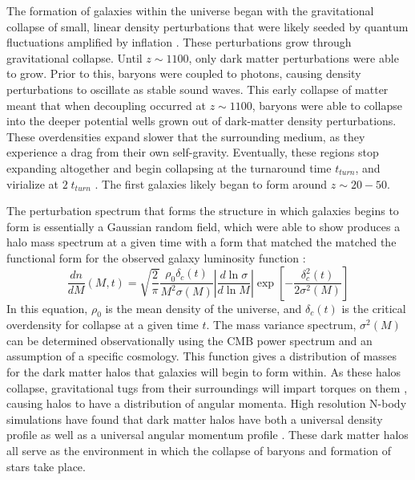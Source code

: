 The formation of galaxies within the universe began with the gravitational
collapse of small, linear density perturbations that were likely seeded by
quantum fluctuations amplified by inflation
\citep{Guth1981,Linde1982}.  These perturbations grow through
gravitational collapse.  Until $z\sim1100$, only dark matter perturbations were
able to grow.  Prior to this, baryons were coupled to photons, causing density
perturbations to oscillate as stable sound waves.  This early collapse
of matter meant that when decoupling occurred at $z\sim1100$, baryons were able
to collapse into the deeper potential wells grown out of dark-matter density
perturbations.  These overdensities expand slower that the surrounding medium,
as they experience a drag from their own self-gravity.  Eventually, these
regions stop expanding altogether and begin collapsing at the turnaround time
$t_{turn}$, and virialize at $2\;t_{turn}$ \citep{Peebles1980}. The first
galaxies likely began to form around $z\sim20-50$.

The perturbation spectrum that forms the structure in which galaxies begins to
form is essentially a Gaussian random field, which \citet{Press1974} were able
to show produces a halo mass spectrum at a given time with a form that matched
the matched the functional form for the observed galaxy luminosity function
\citet{Schechter1976}:
\begin{equation}
    \frac{dn}{dM}(M,t) =
    \sqrt{\frac{2}{\pi}}\frac{\rho_0\delta_c(t)}{M^2\sigma(M)} 
    \left\lvert\frac{d\ln{\sigma}}{d\ln{M}}\right\rvert
    \exp{\left[-\frac{\delta^2_c(t)}{2\sigma^2(M)}\right]}
\end{equation}
In this equation, $\rho_0$ is the mean density of the universe, and
$\delta_c(t)$ is the critical overdensity for collapse at a given time $t$.
The mass variance spectrum, $\sigma^2(M)$ can be determined observationally
using the CMB power spectrum \citep{Fixsen1996,Spergel2003,Planck2015} and an
assumption of a specific cosmology.  This function gives a distribution of
masses for the dark matter halos that galaxies will begin to form within.  As
these halos collapse, gravitational tugs from their surroundings will impart
torques on them \citep{Barnes1987}, causing halos to have a distribution of
angular momenta.  High resolution N-body simulations have found that dark
matter halos have both a universal density profile
\citep{Navarro1996,Merritt2006} as well as a universal angular momentum profile
\citep{Bullock2001}.  These dark matter halos all serve as the environment in
which the collapse of baryons and formation of stars take place.

